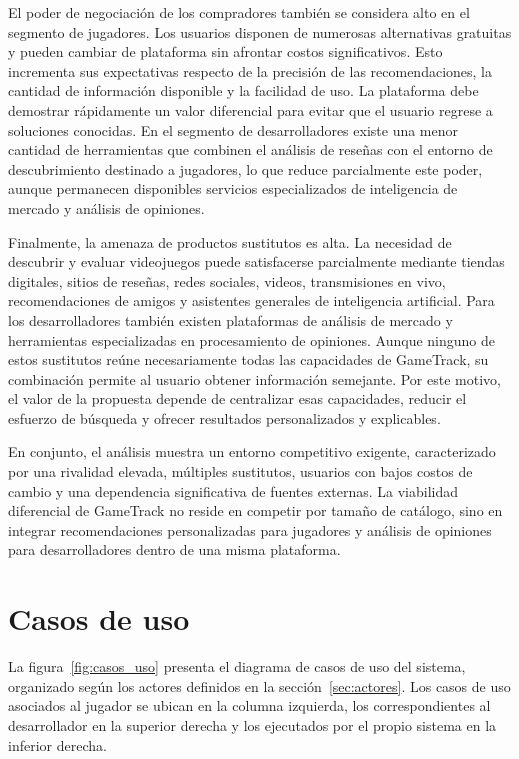 El poder de negociación de los compradores también se considera alto en el segmento de jugadores. Los usuarios disponen de numerosas alternativas gratuitas y pueden cambiar de plataforma sin afrontar costos significativos. Esto incrementa sus expectativas respecto de la precisión de las recomendaciones, la cantidad de información disponible y la facilidad de uso. La plataforma debe demostrar rápidamente un valor diferencial para evitar que el usuario regrese a soluciones conocidas. En el segmento de desarrolladores existe una menor cantidad de herramientas que combinen el análisis de reseñas con el entorno de descubrimiento destinado a jugadores, lo que reduce parcialmente este poder, aunque permanecen disponibles servicios especializados de inteligencia de mercado y análisis de opiniones.

Finalmente, la amenaza de productos sustitutos es alta. La necesidad de descubrir y evaluar videojuegos puede satisfacerse parcialmente mediante tiendas digitales, sitios de reseñas, redes sociales, videos, transmisiones en vivo, recomendaciones de amigos y asistentes generales de inteligencia artificial. Para los desarrolladores también existen plataformas de análisis de mercado y herramientas especializadas en procesamiento de opiniones. Aunque ninguno de estos sustitutos reúne necesariamente todas las capacidades de GameTrack, su combinación permite al usuario obtener información semejante. Por este motivo, el valor de la propuesta depende de centralizar esas capacidades, reducir el esfuerzo de búsqueda y ofrecer resultados personalizados y explicables.

En conjunto, el análisis muestra un entorno competitivo exigente, caracterizado por una rivalidad elevada, múltiples sustitutos, usuarios con bajos costos de cambio y una dependencia significativa de fuentes externas. La viabilidad diferencial de GameTrack no reside en competir por tamaño de catálogo, sino en integrar recomendaciones personalizadas para jugadores y análisis de opiniones para desarrolladores dentro de una misma plataforma.

\section{Casos de uso}\label{sec:casos_uso}

La figura~\ref{fig:casos_uso} presenta el diagrama de casos de uso del sistema, organizado según los actores definidos en la sección~\ref{sec:actores}. Los casos de uso asociados al jugador se ubican en la columna izquierda, los correspondientes al desarrollador en la superior derecha y los ejecutados por el propio sistema en la inferior derecha.

